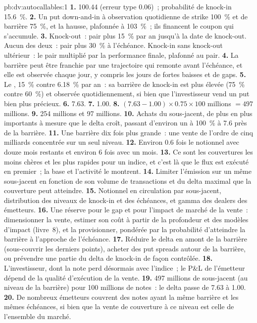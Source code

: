 \begin{solution}{pb:dv:autocallables:1}
\textbf{1.} 100.44 (erreur type 0.06)~; probabilité de knock-in 15.6~\%.
\textbf{2.} Un put down-and-in à observation quotidienne de strike 100~\% et de barrière 75~\%, et la hausse, plafonnée à 103~\%~; ils financent le
coupon qui s'accumule.
\textbf{3.} Knock-out~: pair plus 15~\% par an jusqu'à la date de knock-out. Aucun des deux~: pair plus 30~\% à l'échéance. Knock-in sans knock-out ultérieur~:
le pair multiplié par la performance finale, plafonné au pair.
\textbf{4.} La barrière peut être franchie par une trajectoire qui remonte avant l'échéance, et elle est observée chaque jour, y compris les jours de fortes baisses
et de gaps.
\textbf{5.} Le , 15~\% contre 6.18~\% par an~: sa barrière de knock-in est plus élevée (75~\% contre 60~\%) et observée quotidiennement, si bien que l'investisseur vend
un put bien plus précieux.
\textbf{6.} 7.63.
\textbf{7.} 1.00.
\textbf{8.} $(7.63-1.00)\times0.75\times100$ millions $=497$ millions.
\textbf{9.} 254 millions et 97 millions.
\textbf{10.} Achats du sous-jacent, de plus en plus importants à mesure que le delta croît, passant d'environ un à 100~\% à 7.6 près de la barrière.
\textbf{11.} Une barrière dix fois plus grande~: une vente de l'ordre de cinq milliards concentrée sur un seul niveau.
\textbf{12.} Environ 0.6 fois le notionnel avec douze mois restants et environ 6 fois avec un mois.
\textbf{13.} Ce sont les couvertures les moins chères et les plus rapides pour un indice, et c'est là que le flux est exécuté en premier~; la base et l'activité le montrent.
\textbf{14.} Limiter l'émission sur un même sous-jacent en fonction de son volume de transactions et du delta maximal que la couverture peut atteindre.
\textbf{15.} Notionnel en circulation par sous-jacent, distribution des niveaux de knock-in et des échéances, et gamma des dealers des émetteurs.
\textbf{16.} Une réserve pour le gap et pour l'impact de marché de la vente~: dimensionner la vente, estimer son coût à partir de la profondeur et des modèles d'impact
(livre~8), et la provisionner, pondérée par la probabilité d'atteindre la barrière à l'approche de l'échéance.
\textbf{17.} Réduire le delta en amont de la barrière (sous-couvrir les derniers points), acheter des put spreads autour de la barrière, ou prévendre une partie du
delta de knock-in de façon contrôlée.
\textbf{18.} L'investisseur, dont la note perd désormais avec l'indice~; le P\&L de l'émetteur dépend de la qualité d'exécution de la vente.
\textbf{19.} 497 millions de sous-jacent (au niveau de la barrière) pour 100 millions de notes~: le delta passe de 7.63 à 1.00.
\textbf{20.} De nombreux émetteurs couvrent des notes ayant la même barrière et les mêmes échéances, si bien que la vente de couverture à ce niveau est celle de l'ensemble du marché.
\end{solution}

